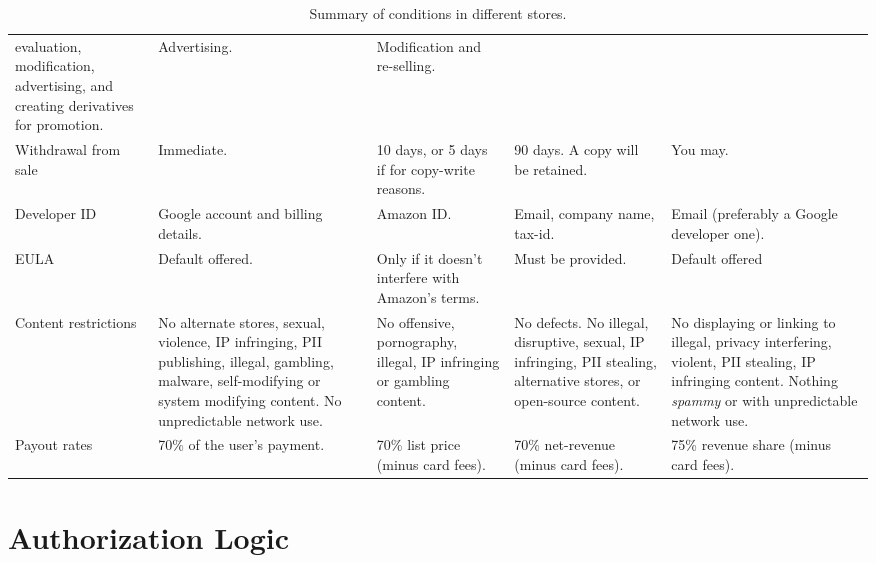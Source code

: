 \documentclass[thesis.tex]{subfiles}
\begin{document}
\begin{table*}
\begin{tabulary}{\linewidth}{lLLLL}
    evaluation, modification, advertising, and creating derivatives for
    promotion. & Advertising. & Modification and re-selling.\\
    Withdrawal from sale & Immediate. & 10 days, or 5 days if for copy-write
    reasons. & 90 days. A copy will be retained. & You may.\\
    Developer ID & Google account and billing details. & Amazon ID. & Email,
    company name, tax-id. & Email (preferably a Google developer
    one).\\
    EULA & Default offered. & Only if it doesn't interfere with Amazon's
    terms. & Must be provided. & Default offered\\
    Content restrictions & No alternate stores, sexual, violence, IP
    infringing, PII publishing, illegal, gambling, malware, self-modifying
    or system modifying content. No unpredictable network use. & No
    offensive, pornography, illegal, IP infringing or gambling content. & No
    defects. No illegal, disruptive, sexual, IP infringing, PII stealing,
    alternative stores, or open-source content. & No displaying or linking
    to illegal, privacy interfering, violent, PII stealing, IP infringing
    content. Nothing \emph{spammy} or with unpredictable network
    use.\\
    Payout rates & 70\% of the user's payment. & 70\% list price (minus card
    fees). & 70\% net-revenue (minus card fees). & 75\% revenue share (minus
    card fees).\\
    \bottomrule
  \end{tabulary}
  \label{tab:store-tandcs}
  \caption{Summary of conditions in different stores.}
\end{table*}

\section{Authorization Logic}
\label{sec:authorization-logic}
\end{document}
